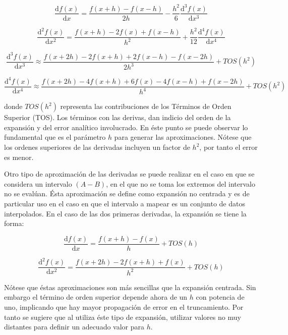 \documentclass[letterpaper,10pt,oneside]{sphinxmanual}
\theoremstyle{plain}%
\theoremstyle{definition}%
\theoremstyle{remark}%
\begin{document}
\begin{equation}
\frac{\mathrm{d}f(x)}{\mathrm{d}x} = \frac{f(x + h) - f(x -h)}{2h} - \frac{h^2}{6}\frac{\mathrm{d}^{3}f(x)}{\mathrm{d}x^{3}}
\end{equation}

\begin{equation}
\frac{\mathrm{d}^{2}f(x)}{\mathrm{d}x^{2}} = \frac{f(x + h) - 2f(x) + f(x - h)}{h^2} + \frac{h^2}{12}\frac{\mathrm{d}^{4}f(x)}{\mathrm{d}x^{4}}
\end{equation}

\begin{equation}
\frac{\mathrm{d}^{3}f(x)}{\mathrm{d}x^{3}} \approx \frac{f(x + 2h) - 2f(x + h) + 2f(x - h) - f(x - 2h)}{2h^3} + TOS(h^2)
\end{equation}

\begin{equation}
\frac{\mathrm{d}^{4}f(x)}{\mathrm{d}x^{4}} \approx \frac{f(x + 2h) - 4f(x + h) + 6f(x) - 4f(x - h) + f(x - 2h)}{h^4} + TOS(h^2)
\end{equation}

donde $TOS(h^2)$ representa las contribuciones de los Términos de Orden Superior (TOS). Los términos con las derivas, dan indicio del orden de la expansión y del error analítico involucrado. En éste punto se puede observar lo fundamental que es el parámetro $h$ para generar las aproximaciones. Nótese que los ordenes superiores de las derivadas incluyen un factor de $h^2$, por tanto el error es menor.

Otro tipo de aproximación de las derivadas se puede realizar en el caso en que se considera un intervalo $(A-B)$, en el que no se toma los extremos del intervalo no se evalúan. Ésta aproximación se define como expansión no centrada y es de particular uso en el caso en que el intervalo a mapear es un conjunto de datos interpolados. En el caso de las dos primeras derivadas, la expansión se tiene la forma:

\begin{equation}
\frac{\mathrm{d}f(x)}{\mathrm{d}x} = \frac{f(x + h) -  f(x)}{h} + TOS(h)
\end{equation}

\begin{equation}
\frac{\mathrm{d}^{2}f(x)}{\mathrm{d}x^{2}} = \frac{f(x + 2h) -  2f(x + h) + f(x)}{h^2} + TOS(h)
\end{equation}

Nótese que éstas aproximaciones son más sencillas que la expansión centrada. Sin embargo el término de orden superior depende ahora de un $h$ con potencia de uno, implicando que hay mayor propagación de error en el truncamiento. Por tanto se sugiere que al utiliza éste tipo de expansión, utilizar valores no muy distantes para definir un adecuado valor para $h$.
\end{document}
